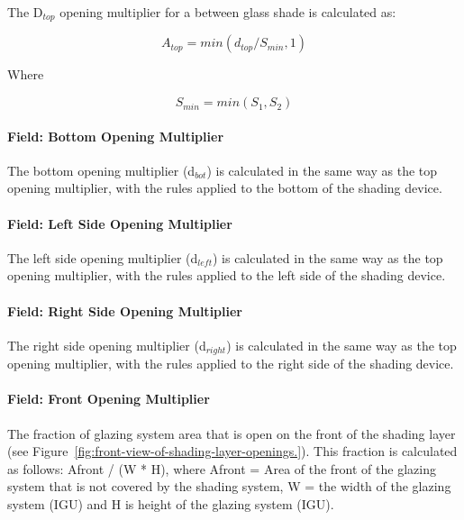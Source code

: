 The D\(_{top}\) opening multiplier for a between glass shade is calculated as:

\begin{equation*}
A_{top} = min(d_{top}/S_{min}, 1)
\end{equation*}

Where

\begin{equation*}
S_{min} = min(S_1, S_2)
\end{equation*}

\paragraph{Field: Bottom Opening Multiplier}\label{field-bottom-opening-multiplier-1}

The bottom opening multiplier (d\(_{bot}\)) is calculated in the same way as the top opening multiplier, with the rules applied to the bottom of the shading device.

\paragraph{Field: Left Side Opening Multiplier}\label{field-left-side-opening-multiplier-1}

The left side opening multiplier (d\(_{left}\)) is calculated in the same way as the top opening multiplier, with the rules applied to the left side of the shading device.

\paragraph{Field: Right Side Opening Multiplier}\label{field-right-side-opening-multiplier-1}

The right side opening multiplier (d\(_{right}\)) is calculated in the same way as the top opening multiplier, with the rules applied to the right side of the shading device.

\paragraph{Field: Front Opening Multiplier}\label{field-front-opening-multiplier}

The fraction of glazing system area that is open on the front of the shading layer (see Figure~\ref{fig:front-view-of-shading-layer-openings.}). This fraction is calculated as follows: Afront / (W * H), where Afront = Area of the front of the glazing system that is not covered by the shading system, W = the width of the glazing system (IGU) and H is height of the glazing system (IGU).

